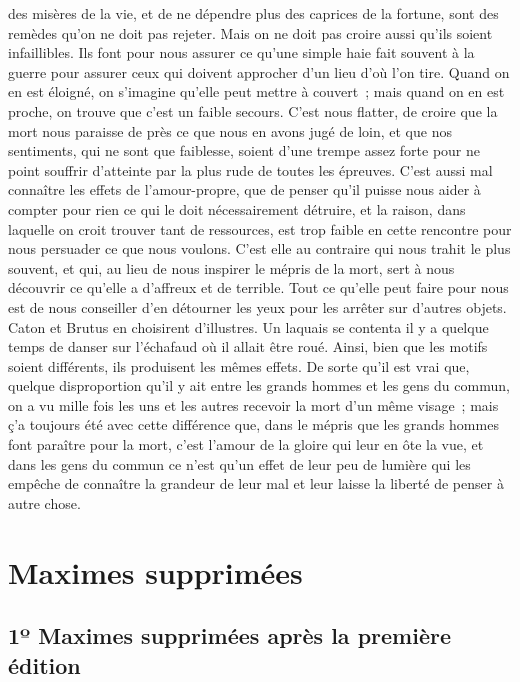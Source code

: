 \documentclass[french,twoside]{book} %
\begin{document}
des misères de la vie, et de ne dépendre plus des caprices de la fortune, sont des remèdes qu’on ne doit pas rejeter. Mais on ne doit pas croire aussi qu’ils soient infaillibles. Ils font pour nous assurer ce qu’une simple haie fait souvent à la guerre pour assurer ceux qui doivent approcher d’un lieu d’où l’on tire. Quand on en est éloigné, on s’imagine qu’elle peut mettre à couvert ; mais quand on en est proche, on trouve que c’est un faible secours. C’est nous flatter, de croire que la mort nous paraisse de près ce que nous en avons jugé de loin, et que nos sentiments, qui ne sont que faiblesse, soient d’une trempe assez forte pour ne point souffrir d’atteinte par la plus rude de toutes les épreuves. C’est aussi mal connaître les effets de l’amour-propre, que de penser qu’il puisse nous aider à compter pour rien ce qui le doit nécessairement détruire, et la raison, dans laquelle on croit trouver tant de ressources, est trop faible en cette rencontre pour nous persuader ce que nous voulons. C’est elle au contraire qui nous trahit le plus souvent, et qui, au lieu de nous inspirer le mépris de la mort, sert à nous découvrir ce qu’elle a d’affreux et de terrible. Tout ce qu’elle peut faire pour nous est de nous conseiller d’en détourner les yeux pour les arrêter sur d’autres objets. Caton et Brutus en choisirent d’illustres. Un laquais se contenta il y a quelque temps de danser sur l’échafaud où il allait être roué. Ainsi, bien que les motifs soient différents, ils produisent les mêmes effets. De sorte qu’il est vrai que, quelque disproportion qu’il y ait entre les grands hommes et les gens du commun, on a vu mille fois les uns et les autres recevoir la mort d’un même visage ; mais ç’a toujours été avec cette différence que, dans le mépris que les grands hommes font paraître pour la mort, c’est l’amour de la gloire qui leur en ôte la vue, et dans les gens du commun ce n’est qu’un effet de leur peu de lumière qui les empêche de connaître la grandeur de leur mal et leur laisse la liberté de penser à autre chose.
\section[{Maximes supprimées}]{Maximes supprimées}\renewcommand{\leftmark}{Maximes supprimées}

\subsection[{1º Maximes supprimées après la première édition}]{1º Maximes supprimées après la première édition}
\end{document}
